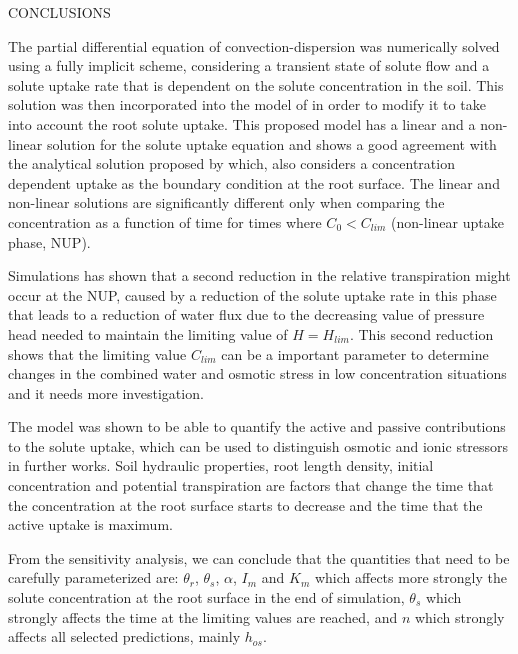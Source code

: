 \cleardoublepage
\chap CONCLUSIONS

The partial differential equation of convection-dispersion was numerically solved using a fully implicit scheme, considering a transient state of solute flow and a solute uptake rate that is dependent on the solute concentration in the soil.
This solution was then incorporated into the model of \citeonline[liersolute] in order to modify it to take into account the root solute uptake.
This proposed model has a linear and a non-linear solution for the solute uptake equation and shows a good agreement with the analytical solution proposed by \citeonline[cushman] which, also considers a concentration dependent uptake as the boundary condition at the root surface.
The linear and non-linear solutions are significantly different only when comparing the concentration as a function of time for times where $C_0 < C_{lim}$ (non-linear uptake phase, NUP).

Simulations has shown that a second reduction in the relative transpiration might occur at the NUP, caused by a reduction of the solute uptake rate in this phase that leads to a reduction of water flux due to the decreasing value of pressure head needed to maintain the limiting value of $H=H_{lim}$.
This second reduction shows that the limiting value $C_{lim}$ can be a important parameter to determine changes in the combined water and osmotic stress in low concentration situations and it needs more investigation.

The model was shown to be able to quantify the active and passive contributions to the solute uptake, which can be used to distinguish osmotic and ionic stressors in further works.
Soil hydraulic properties, root length density, initial concentration and potential transpiration are factors that change the time that the concentration at the root surface starts to decrease and the time that the active uptake is maximum. 


From the sensitivity analysis, we can conclude that the quantities that need to be carefully parameterized are: $\theta_r$, $\theta_s$, $\alpha$, $I_m$ and $K_m$ which affects more strongly the solute concentration at the root surface in the end of simulation, $\theta_s$ which strongly affects the time at the limiting values are reached, and $n$ which strongly affects all selected predictions, mainly $h_{os}$. 

